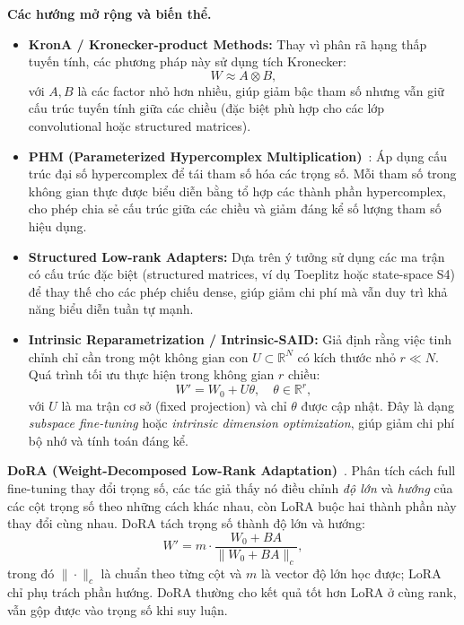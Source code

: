 \textbf{Các hướng mở rộng và biến thể.}
\begin{itemize}
	\item \textbf{KronA / Kronecker-product Methods\cite{buczak2023krona}:}  
	Thay vì phân rã hạng thấp tuyến tính, các phương pháp này sử dụng tích Kronecker:
	\[
	W \approx A \otimes B,
	\]
	với $A, B$ là các factor nhỏ hơn nhiều, giúp giảm bậc tham số nhưng vẫn giữ cấu trúc tuyến tính giữa các chiều (đặc biệt phù hợp cho các lớp convolutional hoặc structured matrices).
	
	\item \textbf{PHM (Parameterized Hypercomplex Multiplication)}~\cite{zhang2021phm}:  
	Áp dụng cấu trúc đại số hypercomplex để tái tham số hóa các trọng số.  
	Mỗi tham số trong không gian thực được biểu diễn bằng tổ hợp các thành phần hypercomplex, cho phép chia sẻ cấu trúc giữa các chiều và giảm đáng kể số lượng tham số hiệu dụng.  
	
	\item \textbf{Structured Low-rank Adapters:}
	Dựa trên ý tưởng sử dụng các ma trận có cấu trúc đặc biệt (structured matrices, ví dụ Toeplitz hoặc state-space S4) để thay thế cho các phép chiếu dense, giúp giảm chi phí mà vẫn duy trì khả năng biểu diễn tuần tự mạnh.
	
	\item \textbf{Intrinsic Reparametrization / Intrinsic-SAID:}  
	Giả định rằng việc tinh chỉnh chỉ cần trong một không gian con $U \subset \mathbb{R}^N$ có kích thước nhỏ $r \ll N$.  
	Quá trình tối ưu thực hiện trong không gian $r$ chiều:
	\[
	W' = W_0 + U \theta, \quad \theta \in \mathbb{R}^r,
	\]
	với $U$ là ma trận cơ sở (fixed projection) và chỉ $\theta$ được cập nhật.  
	Đây là dạng \textit{subspace fine-tuning} hoặc \textit{intrinsic dimension optimization}\cite{aghajanyan2021intrinsic}, giúp giảm chi phí bộ nhớ và tính toán đáng kể.
\end{itemize}

\textbf{DoRA (Weight-Decomposed Low-Rank Adaptation)}~\cite{liu2024dora}.
Phân tích cách full fine-tuning thay đổi trọng số, các tác giả thấy nó điều chỉnh \emph{độ lớn} và \emph{hướng} của các cột trọng số theo những cách khác nhau, còn LoRA buộc hai thành phần này thay đổi cùng nhau. DoRA tách trọng số thành độ lớn và hướng:
\[
W' = m \cdot \frac{W_0 + BA}{\|W_0 + BA\|_c},
\]
trong đó $\|\cdot\|_c$ là chuẩn theo từng cột và $m$ là vector độ lớn học được; LoRA chỉ phụ trách phần hướng. DoRA thường cho kết quả tốt hơn LoRA ở cùng rank, vẫn gộp được vào trọng số khi suy luận.

